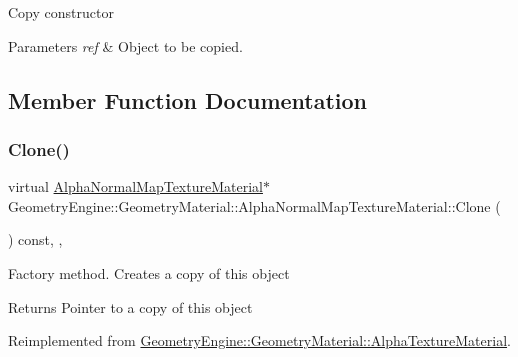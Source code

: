 Copy constructor 
\begin{DoxyParams}{Parameters}
{\em ref} & Object to be copied. \\
\hline
\end{DoxyParams}


\subsection{Member Function Documentation}
\mbox{\label{class_geometry_engine_1_1_geometry_material_1_1_alpha_normal_map_texture_material_a4dff732a06c94a7761a054ca62dbd491}} 
\subsubsection{\texorpdfstring{Clone()}{Clone()}}
{\footnotesize\ttfamily virtual \mbox{\hyperlink{class_geometry_engine_1_1_geometry_material_1_1_alpha_normal_map_texture_material}{Alpha\+Normal\+Map\+Texture\+Material}}$\ast$ Geometry\+Engine\+::\+Geometry\+Material\+::\+Alpha\+Normal\+Map\+Texture\+Material\+::\+Clone (\begin{DoxyParamCaption}{ }\end{DoxyParamCaption}) const\hspace{0.3cm}{\ttfamily [inline]}, {\ttfamily [override]}, {\ttfamily [virtual]}}

Factory method. Creates a copy of this object \begin{DoxyReturn}{Returns}
Pointer to a copy of this object 
\end{DoxyReturn}


Reimplemented from \mbox{\hyperlink{class_geometry_engine_1_1_geometry_material_1_1_alpha_texture_material_a27375f0008fcdeaacb49fb4266f9f480}{Geometry\+Engine\+::\+Geometry\+Material\+::\+Alpha\+Texture\+Material}}.

\mbox{\label{class_geometry_engine_1_1_geometry_material_1_1_alpha_normal_map_texture_material_acf15c4344df03bb0f4f8dbe64ab5b3a1}} 
